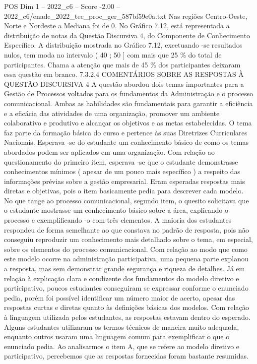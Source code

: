 \begin{textsample}{POS Dim 1 – 2022\_c6 – Score -2.00 – 2022\_c6/enade\_2022\_tec\_proc\_ger\_587bf59e0a.txt}
Nas regiões Centro-Oeste, Norte e Nordeste a Mediana foi de 0.
No Gráfico 7.12, está representada a distribuição de notas da Questão Discursiva 4, do Componente de Conhecimento Específico.
A distribuição mostrada no Gráfico 7.12, excetuando -se resultados nulos, tem moda no intervalo ( 40 ; 50 ] com mais que 25 \% do total de participantes.
Chama a atenção que mais de 45 \% dos participantes deixaram essa questão em branco. 7.3.2.4 COMENTÁRIOS SOBRE AS RESPOSTAS À QUESTÃO DISCURSIVA 4 A questão abordou dois temas importantes para a Gestão de Processos voltados para os fundamentos da Administração e o processo comunicacional.
Ambas as habilidades são fundamentais para garantir a eficiência e a eficácia das atividades de uma organização, promover um ambiente colaborativo e produtivo e alcançar os objetivos e as metas estabelecidas.
O tema faz parte da formação básica do curso e pertence às suas Diretrizes Curriculares Nacionais.
Esperava -se do estudante um conhecimento básico de como os temas abordados podem ser aplicados em uma organização.
Com relação ao questionamento do primeiro item, esperava -se que o estudante demonstrasse conhecimentos mínimos ( apesar de um pouco mais específico ) a respeito das informações prévias sobre a gestão empresarial.
Eram esperadas respostas mais diretas e objetivas, pois o item basicamente pedia para descrever cada modelo.
No que tange ao processo comunicacional, segundo item, o quesito solicitava que o estudante mostrasse um conhecimento básico sobre a área, explicando o processo e exemplificando -o com três elementos.
A maioria dos estudantes respondeu de forma semelhante ao que constava no padrão de resposta, pois não conseguiu reproduzir um conhecimento mais detalhado sobre o tema, em especial, sobre os elementos do processo comunicacional.
Com relação ao modo que como este modelo ocorre na administração participativa, uma pequena parte explanou a resposta, mas sem demonstrar grande segurança e riqueza de detalhes.
Já em relação à explicação clara e condizente dos fundamentos do modelo diretivo e participativo, poucos estudantes conseguiram se expressar conforme o enunciado pedia, porém foi possível identificar um número maior de acerto, apesar das respostas curtas e diretas quanto às definições básicas dos modelos.
Com relação à linguagem utilizada pelos estudantes, as respostas estavam dentro do esperado.
Alguns estudantes utilizaram os termos técnicos de maneira muito adequada, enquanto outros usaram uma linguagem comum para exemplificar o que o enunciado pedia.
Ao analisarmos o item A, que se refere ao modelo diretivo e participativo, percebemos que as respostas fornecidas foram bastante resumidas.

\end{textsample}
